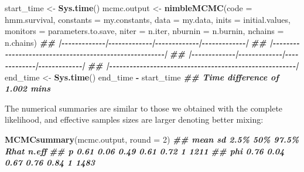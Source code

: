 \documentclass[
  12pt,
]{krantz}
\newenvironment{Shaded}{\begin{snugshade}}{\end{snugshade}}
\newcommand{\AttributeTok}[1]{\textcolor[rgb]{0.13,0.29,0.53}{#1}}
\newcommand{\DecValTok}[1]{\textcolor[rgb]{0.00,0.00,0.81}{#1}}
\newcommand{\DocumentationTok}[1]{\textcolor[rgb]{0.56,0.35,0.01}{\textbf{\textit{#1}}}}
\newcommand{\FunctionTok}[1]{\textcolor[rgb]{0.13,0.29,0.53}{\textbf{#1}}}
\newcommand{\NormalTok}[1]{#1}
\newcommand{\OtherTok}[1]{\textcolor[rgb]{0.56,0.35,0.01}{#1}}
\newcommand{\SpecialCharTok}[1]{\textcolor[rgb]{0.81,0.36,0.00}{\textbf{#1}}}
\begin{document}
\begin{Shaded}
\begin{Highlighting}[]
\NormalTok{start\_time }\OtherTok{\textless{}{-}} \FunctionTok{Sys.time}\NormalTok{()}
\NormalTok{mcmc.output }\OtherTok{\textless{}{-}} \FunctionTok{nimbleMCMC}\NormalTok{(}\AttributeTok{code =}\NormalTok{ hmm.survival,}
                          \AttributeTok{constants =}\NormalTok{ my.constants,}
                          \AttributeTok{data =}\NormalTok{ my.data,}
                          \AttributeTok{inits =}\NormalTok{ initial.values,}
                          \AttributeTok{monitors =}\NormalTok{ parameters.to.save,}
                          \AttributeTok{niter =}\NormalTok{ n.iter,}
                          \AttributeTok{nburnin =}\NormalTok{ n.burnin,}
                          \AttributeTok{nchains =}\NormalTok{ n.chains)}
\DocumentationTok{\#\# |{-}{-}{-}{-}{-}{-}{-}{-}{-}{-}{-}{-}{-}|{-}{-}{-}{-}{-}{-}{-}{-}{-}{-}{-}{-}{-}|{-}{-}{-}{-}{-}{-}{-}{-}{-}{-}{-}{-}{-}|{-}{-}{-}{-}{-}{-}{-}{-}{-}{-}{-}{-}{-}|}
\DocumentationTok{\#\# |{-}{-}{-}{-}{-}{-}{-}{-}{-}{-}{-}{-}{-}{-}{-}{-}{-}{-}{-}{-}{-}{-}{-}{-}{-}{-}{-}{-}{-}{-}{-}{-}{-}{-}{-}{-}{-}{-}{-}{-}{-}{-}{-}{-}{-}{-}{-}{-}{-}{-}{-}{-}{-}{-}{-}|}
\DocumentationTok{\#\# |{-}{-}{-}{-}{-}{-}{-}{-}{-}{-}{-}{-}{-}|{-}{-}{-}{-}{-}{-}{-}{-}{-}{-}{-}{-}{-}|{-}{-}{-}{-}{-}{-}{-}{-}{-}{-}{-}{-}{-}|{-}{-}{-}{-}{-}{-}{-}{-}{-}{-}{-}{-}{-}|}
\DocumentationTok{\#\# |{-}{-}{-}{-}{-}{-}{-}{-}{-}{-}{-}{-}{-}{-}{-}{-}{-}{-}{-}{-}{-}{-}{-}{-}{-}{-}{-}{-}{-}{-}{-}{-}{-}{-}{-}{-}{-}{-}{-}{-}{-}{-}{-}{-}{-}{-}{-}{-}{-}{-}{-}{-}{-}{-}{-}|}
\NormalTok{end\_time }\OtherTok{\textless{}{-}} \FunctionTok{Sys.time}\NormalTok{()}
\NormalTok{end\_time }\SpecialCharTok{{-}}\NormalTok{ start\_time}
\DocumentationTok{\#\# Time difference of 1.002 mins}
\end{Highlighting}
\end{Shaded}

The numerical summaries are similar to those we obtained with the complete likelihood, and effective samples sizes are larger denoting better mixing:

\begin{Shaded}
\begin{Highlighting}[]
\FunctionTok{MCMCsummary}\NormalTok{(mcmc.output, }\AttributeTok{round =} \DecValTok{2}\NormalTok{)}
\DocumentationTok{\#\#     mean   sd 2.5\%  50\% 97.5\% Rhat n.eff}
\DocumentationTok{\#\# p   0.61 0.06 0.49 0.61  0.72    1  1211}
\DocumentationTok{\#\# phi 0.76 0.04 0.67 0.76  0.84    1  1483}
\end{Highlighting}
\end{Shaded}
\end{document}
